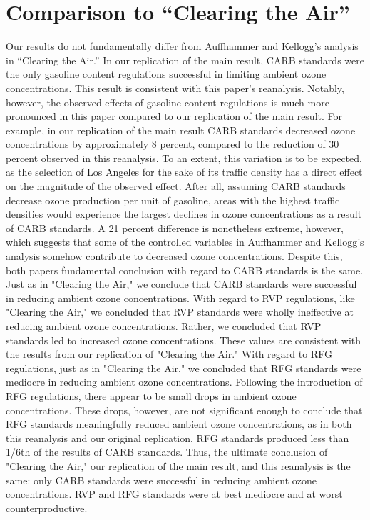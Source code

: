 \documentclass{article}
\begin{document}
\section{Comparison to ``Clearing the Air''}
Our results do not fundamentally differ from Auffhammer and Kellogg's analysis in ``Clearing the Air.'' In our replication of the main result, CARB standards were the only gasoline content regulations successful in limiting ambient ozone concentrations. This result is consistent with this paper's reanalysis. Notably, however, the observed effects of gasoline content regulations is much more pronounced in this paper compared to our replication of the main result. For example, in our replication of the main result CARB standards decreased ozone concentrations by approximately 8 percent, compared to the reduction of 30 percent observed in this reanalysis. To an extent, this variation is to be expected, as the selection of Los Angeles for the sake of its traffic density has a direct effect on the magnitude of the observed effect. After all, assuming CARB standards decrease ozone production per unit of gasoline, areas with the highest traffic densities would experience the largest declines in ozone concentrations as a result of CARB standards. A 21 percent difference is nonetheless extreme, however, which suggests that some of the controlled variables in Auffhammer and Kellogg's analysis somehow contribute to decreased ozone concentrations. Despite this, both papers fundamental conclusion with regard to CARB standards is the same. Just as in "Clearing the Air," we conclude that CARB standards were successful in reducing ambient ozone concentrations. With regard to RVP regulations, like "Clearing the Air," we concluded that RVP standards were wholly ineffective at reducing ambient ozone concentrations. Rather, we concluded that RVP standards led to increased ozone concentrations. These values are consistent with the results from our replication of "Clearing the Air." With regard to RFG regulations, just as in "Clearing the Air," we concluded that RFG standards were mediocre in reducing ambient ozone concentrations. Following the introduction of RFG regulations, there appear to be small drops in ambient ozone concentrations. These drops, however, are not significant enough to conclude that RFG standards meaningfully reduced ambient ozone concentrations, as in both this reanalysis and our original replication, RFG standards produced less than 1/6th of the results of CARB standards.  Thus, the ultimate conclusion of "Clearing the Air," our replication of the main result, and this reanalysis is the same: only CARB standards were successful in reducing ambient ozone concentrations. RVP and RFG standards were at best mediocre and at worst counterproductive.
\end{document}
